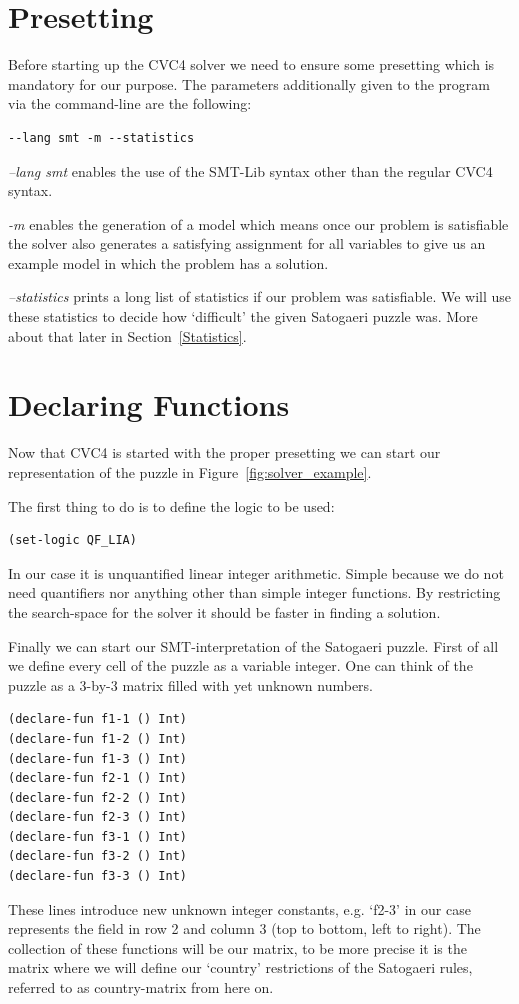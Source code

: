 \section{Presetting}
Before starting up the CVC4 solver we need to ensure some presetting which is mandatory for our purpose.
The parameters additionally given to the program via the command-line are the following:
\begin{lstlisting}
--lang smt -m --statistics
\end{lstlisting}

\emph{--lang smt} enables the use of the SMT-Lib syntax other than the regular CVC4 syntax.

\emph{-m} enables the generation of a model which means once our problem is satisfiable the solver also generates a satisfying assignment for all variables to give us an example model in which the problem has a solution.

\emph{--statistics} prints a long list of statistics if our problem was satisfiable. We will use these statistics to decide how `difficult' the given Satogaeri puzzle was. More about that later in Section~\ref{Statistics}. 

\section{Declaring Functions}
Now that CVC4 is started with the proper presetting we can start our representation of the puzzle in Figure~\ref{fig:solver_example}.

The first thing to do is to define the logic to be used:
\begin{lstlisting}
(set-logic QF_LIA)
\end{lstlisting}
In our case it is unquantified linear integer arithmetic. Simple because we do not need quantifiers nor anything other than simple integer functions. By restricting the search-space for the solver it should be faster in finding a solution.

Finally we can start our SMT-interpretation of the Satogaeri puzzle. First of all we define every cell of the puzzle as a variable integer. One can think of the puzzle as a 3-by-3 matrix filled with yet unknown numbers.
\begin{lstlisting}
(declare-fun f1-1 () Int)
(declare-fun f1-2 () Int)
(declare-fun f1-3 () Int)
(declare-fun f2-1 () Int)
(declare-fun f2-2 () Int)
(declare-fun f2-3 () Int)
(declare-fun f3-1 () Int)
(declare-fun f3-2 () Int)
(declare-fun f3-3 () Int)
\end{lstlisting}
These lines introduce new unknown integer constants, e.g. `f2-3' in our case represents the field in row 2 and column 3 (top to bottom, left to right). The collection of these functions will be our matrix, to be more precise it is the matrix where we will define our `country' restrictions of the Satogaeri rules, referred to as country-matrix from here on.

